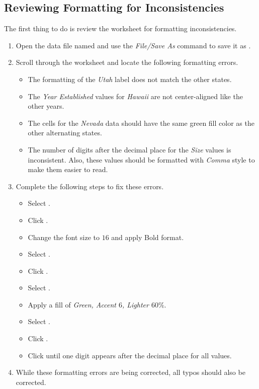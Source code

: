 \subsection{Reviewing Formatting for Inconsistencies}

The first thing to do is review the worksheet for formatting inconsistencies.

\begin{enumbox}
	\begin{enumerate}
		\item Open the data file named  and use the \textit{File/Save As} command to save it as .
		\item Scroll through the worksheet and locate the following formatting errors.
	
		\begin{itemize}
			\item The formatting of the \textit{Utah} label does not match the other states.
			\item The \textit{Year Established} values for \textit{Hawaii} are not center-aligned like the other years.
			\item The cells for the \textit{Nevada} data should have the same green fill color as the other alternating states.
			\item The number of digits after the decimal place for the \textit{Size} values is inconsistent. Also, these values should be formatted with \textit{Comma} style to make them easier to read.
		\end{itemize}
	
		\item Complete the following steps to fix these errors.
	
		\begin{itemize}
			\item Select . 
			\item Click .
			\item Change the font size to $ 16 $ and apply Bold format.
			\item Select .
			\item Click .
			\item Select .
			\item Apply a fill of \textit{Green, Accent $ 6 $, Lighter $ 60\% $}.
			\item Select . 
			\item Click .
			\item Click  until one digit appears after the decimal place for all values.
		\end{itemize}
		
		\item While these formatting errors are being corrected, all typos should also be corrected.
	\end{enumerate}
\end{enumbox}
	

